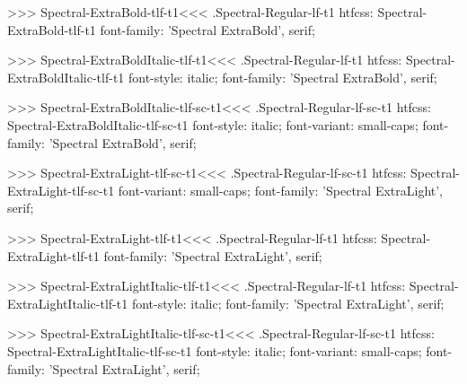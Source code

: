 >>>
\<Spectral-ExtraBold-tlf-t1\><<<
.Spectral-Regular-lf-t1
htfcss:  Spectral-ExtraBold-tlf-t1  font-family: 'Spectral ExtraBold', serif;

>>>
\<Spectral-ExtraBoldItalic-tlf-t1\><<<
.Spectral-Regular-lf-t1
htfcss:  Spectral-ExtraBoldItalic-tlf-t1  font-style: italic; font-family: 'Spectral ExtraBold', serif;

>>>
\<Spectral-ExtraBoldItalic-tlf-sc-t1\><<<
.Spectral-Regular-lf-sc-t1
htfcss:  Spectral-ExtraBoldItalic-tlf-sc-t1  font-style: italic; font-variant: small-caps; font-family: 'Spectral ExtraBold', serif;

>>>
\<Spectral-ExtraLight-tlf-sc-t1\><<<
.Spectral-Regular-lf-sc-t1
htfcss:  Spectral-ExtraLight-tlf-sc-t1  font-variant: small-caps; font-family: 'Spectral ExtraLight', serif;

>>>
\<Spectral-ExtraLight-tlf-t1\><<<
.Spectral-Regular-lf-t1
htfcss:  Spectral-ExtraLight-tlf-t1  font-family: 'Spectral ExtraLight', serif;

>>>
\<Spectral-ExtraLightItalic-tlf-t1\><<<
.Spectral-Regular-lf-t1
htfcss:  Spectral-ExtraLightItalic-tlf-t1  font-style: italic; font-family: 'Spectral ExtraLight', serif;

>>>
\<Spectral-ExtraLightItalic-tlf-sc-t1\><<<
.Spectral-Regular-lf-sc-t1
htfcss:  Spectral-ExtraLightItalic-tlf-sc-t1  font-style: italic; font-variant: small-caps; font-family: 'Spectral ExtraLight', serif;

